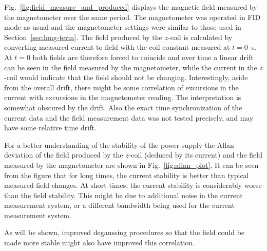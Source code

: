 Fig.~\ref{fig:field_measure_and_produced} displays the magnetic field
measured by the magnetometer over the same period.  The magnetometer
was operated in FID mode as usual and the magnetometer settings were
similar to those used in Section~\ref{sec:long-term}.
The field produced by the $z$-coil is calculated by converting
measured current to field with the coil constant measured at $t=0$~s.
At $t=0$ both fields are therefore forced to coincide and over time a
linear drift can be seen in the field measured by the magnetometer,
while the current in the $z$-coil would indicate that the field should
not be changing.  Interestingly, aside from the overall drift, there
might be some correlation of excursions in the current with excursions
in the magnetometer reading.  The interpretation is somewhat obscured
by the drift.  Also the exact time synchronization of the current data
and the field measurement data was not tested precisely, and may have
some relative time drift.

For a better understanding of the stability of the power supply the
Allan deviation of the field produced by the $z$-coil (deduced by its
current) and the field measured by the magnetometer are shown in
Fig.~\ref{fig:allan_plot}.  It can be seen from the figure that for
long times, the current stability is better than typical measured
field changes.  At short times, the current stability is considerably
worse than the field stability.  This might be due to additional noise
in the current measurement system, or a different bandwidth being used
for the current measurement system.

As will be shown, improved degaussing procedures so that the field
could be made more stable might also have improved this correlation.

%  



